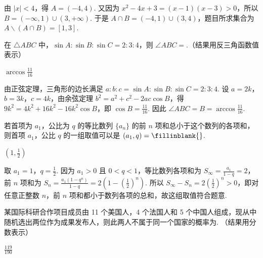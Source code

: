 \begin{solution}
由 \(|x|<4\)，得 \(A=(-4,4)\). 又因为 \(x^2-4x+3=(x-1)(x-3)>0\)，所以 \(B=(-\infty,1)\cup(3,+\infty)\). 于是 \(A\cap B=(-4,1)\cup(3,4)\)，题目所求集合为 \(A\smallsetminus(A\cap B)=[1,3]\).
\end{solution}

\begin{problem}
在 \(\triangle ABC\) 中，\(\sin A: \sin B: \sin C = 2:3:4\)，则 \(\angle ABC =\)\fillinblank{}.（结果用反三角函数值表示）
\end{problem}

\begin{answer}
\(\arccos\frac{11}{16}\)
\end{answer}

\begin{solution}
由正弦定理，三角形的边长满足 \(a:b:c=\sin A:\sin B:\sin C=2:3:4\). 设 \(a=2k\)，\(b=3k\)，\(c=4k\)，由余弦定理 \(b^2=a^2+c^2-2ac\cos B\)，得 \(9k^2=4k^2+16k^2-16k^2\cos B\)，即 \(\cos B=\frac{11}{16}\). 因此 \(\angle ABC=B=\arccos\frac{11}{16}\).
\end{solution}

\begin{problem}
若首项为 \(a_{1}\)，公比为 \(q\) 的等比数列 \(\{a_{n}\}\) 的前 \(n\) 项和总小于这个数列的各项和，则首项 \(a_{1}\)，公比 \(q\) 的一组取值可以是 \((a_{1}, q) =\fillinblank{}\).
\end{problem}

\begin{answer}
\(\left(1,\frac{1}{2}\right)\)
\end{answer}

\begin{solution}
取 \(a_1=1\)，\(q=\frac{1}{2}\). 因为 \(a_1>0\) 且 \(0<q<1\)，等比数列各项和为 \(S_\infty=\frac{a_1}{1-q}=2\)，前 \(n\) 项和为 \(S_n=\frac{a_1(1-q^n)}{1-q}=2\left(1-\left(\frac{1}{2}\right)^n\right)\). 所以 \(S_\infty-S_n=2\left(\frac{1}{2}\right)^n>0\)，即对任意正整数 \(n\)，前 \(n\) 项和都小于数列各项的总和，故这组取值符合题意.
\end{solution}

\begin{problem}
某国际科研合作项目成员由 11 个美国人，4 个法国人和 5 个中国人组成，现从中随机选出两位作为成果发布人，则此两人不属于同一个国家的概率为\fillinblank{}. （结果用分数表示）
\end{problem}

\begin{answer}
\(\frac{119}{190}\)
\end{answer}

